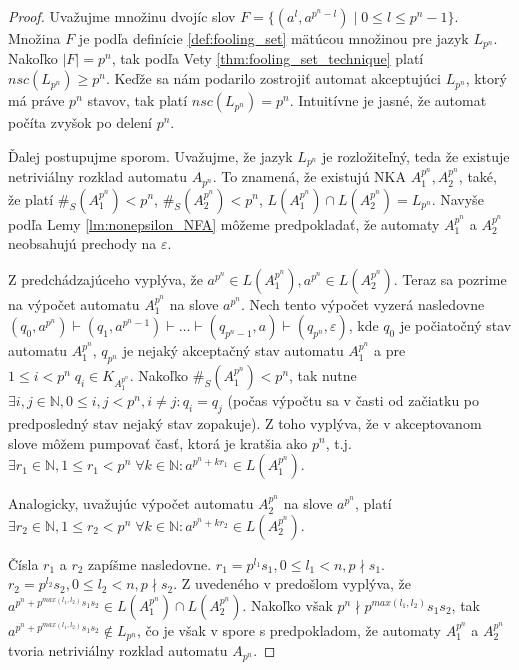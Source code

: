 \begin{proof}
Uvažujme množinu dvojíc slov $ F = \lbrace (a^{l},a^{p^n-l}) \; | \; 0 \leq l \leq p^n-1 \rbrace $. Množina $ F $ je podľa definície \ref{def:fooling_set} mätúcou množinou pre jazyk $ L_{p^n} $. Nakoľko $ |F|=p^n $, tak podľa Vety \ref{thm:fooling_set_technique} platí $ nsc(L_{p^n}) \geq p^n $. Keďže sa nám podarilo zostrojiť automat akceptujúci $ L_{p^n} $, ktorý má práve $ p^n $ stavov, tak platí $ nsc(L_{p^n}) = p^n$. Intuitívne je jasné, že automat \glqq{}počíta zvyšok po delení $ p^n $\grqq{}.
\par
Ďalej postupujme sporom. Uvažujme, že jazyk $ L_{p^n} $ je rozložiteľný, teda že existuje netriviálny rozklad automatu $ A_{p^n} $. To znamená, že existujú NKA $ A_1^{p^n}, A_2^{p^n} $, také, že platí $ \#_S(A_1^{p^n}) < p^n $, $ \#_S(A_2^{p^n}) < p^n $, $ L(A_1^{p^n}) \cap L(A_2^{p^n}) = L_{p^n} $. Navyše podľa Lemy \ref{lm:nonepsilon_NFA} môžeme predpokladať, že automaty $ A_1^{p^n}$ a $ A_2^{p^n} $ neobsahujú prechody na $ \varepsilon $. 
\par
Z predchádzajúceho vyplýva, že $ a^{p^n} \in L(A_1^{p^n}), a^{p^n} \in L(A_2^{p^n})$. Teraz sa pozrime na výpočet automatu $ A_1^{p^n} $ na slove $ a^{p^n} $. Nech tento výpočet vyzerá nasledovne $ (q_0,a^{p^n}) \vdash (q_1,a^{p^n-1}) \vdash \dots \vdash (q_{p^n-1},a) \vdash (q_{p^n},\varepsilon) $, kde $ q_0 $ je počiatočný stav automatu $ A_1^{p^n} $, $ q_{p^n} $ je nejaký akceptačný stav automatu $ A_1^{p^n} $ a pre $ 1 \leq i < p^n \; q_i \in K_{A_1^{p^n}}$. Nakoľko $ \#_S(A_1^{p^n}) < p^n $, tak nutne $ \exists i,j \in \mathbb{N}, 0 \leq i,j < p^n, i \neq j: q_i = q_j $ (počas výpočtu sa v časti \glqq{}od začiatku po predposledný stav\grqq{} nejaký stav zopakuje). Z toho vyplýva, že v akceptovanom slove môžem pumpovať časť, ktorá je kratšia ako $ p^n $, t.j. $ \exists r_1 \in \mathbb{N}, 1 \leq r_1 < p^n \; \forall k \in \mathbb{N}: a^{p^n+kr_1} \in L(A_1^{p^n})$. 
\par
Analogicky, uvažujúc výpočet automatu $ A_2^{p^n} $ na slove $ a^{p^n} $, platí $ \exists r_2 \in \mathbb{N}, 1 \leq r_2 < p^n \; \forall k \in \mathbb{N}: a^{p^n+kr_2} \in L(A_2^{p^n})$.
\par
Čísla $ r_1 $ a $ r_2 $ zapíšme nasledovne. $ r_1 = p^{l_1}s_1, 0 \leq l_1 < n, p \nmid s_1 $. $ r_2 = p^{l_2}s_2, 0 \leq l_2 < n, p \nmid s_2 $. Z uvedeného v predošlom vyplýva, že $ a^{p^n + p^{max(l_1,l_2)}s_1s_2} \in L(A_1^{p^n}) \cap L(A_2^{p^n}) $. Nakoľko však $ p^n \nmid p^{max(l_1,l_2)}s_1s_2$, tak $ a^{p^n + p^{max(l_1,l_2)}s_1s_2} \notin L_{p^n} $, čo je však v spore s predpokladom, že automaty $ A_1^{p^n} $ a $ A_2^{p^n} $ tvoria netriviálny rozklad automatu $ A_{p^n} $.
\end{proof}

